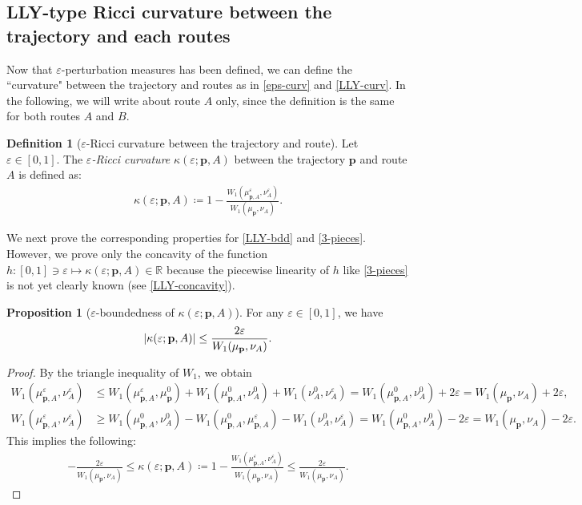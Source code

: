 \documentclass{article}
\numberwithin{equation}{section}
\theoremstyle{definition}
\newtheorem{definition}{Definition}[section]
\newtheorem{proposition}[proposition]{Proposition}
\DeclarePairedDelimiter{\abs}{\lvert}{\rvert}
\newcommand{\R}{\mathbb{R}}
\newcommand{\eps}{\varepsilon} %
\newcommand{\kepa}{\kappa(\eps;\mathbf{p},A)}
\def\:={\coloneqq} %
\begin{document}
\subsection*{LLY-type Ricci curvature between the trajectory and each routes}

Now that $\eps$-perturbation measures has been defined, we can define the ``curvature" between the trajectory and routes as in \autoref{eps-curv} and \autoref{LLY-curv}.
In the following, we will write about route $A$ only, since the definition is the same for both routes $A$ and $B$.

\begin{definition}[$\eps$-Ricci curvature between the trajectory and route]
Let $\eps\in[0,1]$.
The \emph{$\eps$-Ricci curvature} $\kepa$ between the trajectory $\mathbf{p}$ and route $A$ is defined as: 
\begin{align}
    \kepa \:= 1-\frac{W_1(\mu_{\mathbf{p},A}^\eps,\nu_A^\eps)}{W_1(\mu_\mathbf{p},\nu_A)}. \label{eq:kepa}
\end{align}
\end{definition}

We next prove the corresponding properties for \autoref{LLY-bdd} and \autoref{3-pieces}.
However, we prove only the concavity of the function $h:[0,1]\ni\eps\mapsto\kepa\in\R$ because the piecewise linearity of $h$ like \autoref{3-pieces} is not yet clearly known (see \autoref{LLY-concavity}).

\begin{proposition}[$\eps$-boundedness of $\kepa$] \label{eps-bounded}
For any $\eps\in[0,1]$, we have
\begin{align*}
    \abs{\kepa} \le \frac{2\eps}{W_1(\mu_\mathbf{p},\nu_A)}. 
\end{align*}
\end{proposition}

\begin{proof}
By the triangle inequality of $W_1$, we obtain
\begin{align*}
    W_1(\mu_{\mathbf{p},A}^\eps,\nu_A^\eps) 
    &\le W_1(\mu_{\mathbf{p},A}^\eps,\mu_\mathbf{p}^0) + W_1(\mu_{\mathbf{p},A}^0,\nu_A^0) + W_1(\nu_A^0,\nu_A^\eps)
    = W_1(\mu_{\mathbf{p},A}^0,\nu_A^0) + 2\eps
    = W_1(\mu_\mathbf{p},\nu_A) + 2\eps, \\
    W_1(\mu_{\mathbf{p},A}^\eps,\nu_A^\eps) 
    &\ge W_1(\mu_{\mathbf{p},A}^0,\nu_A^0) - W_1(\mu_{\mathbf{p},A}^0,\mu_{\mathbf{p},A}^\eps) - W_1(\nu_A^0,\nu_A^\eps)
    = W_1(\mu_{\mathbf{p},A}^0,\nu_A^0) - 2\eps
    = W_1(\mu_\mathbf{p},\nu_A) - 2\eps.
\end{align*}
This implies the following:
\begin{align*}
    -\frac{2\eps}{W_1(\mu_\mathbf{p},\nu_A)} \le \kepa 
    \:= 1-\frac{W_1(\mu_{\mathbf{p},A}^\eps,\nu_A^\eps)}{W_1(\mu_\mathbf{p},\nu_A)} \le \frac{2\eps}{W_1(\mu_\mathbf{p},\nu_A)}.
\end{align*}
\end{proof}
\end{document}
